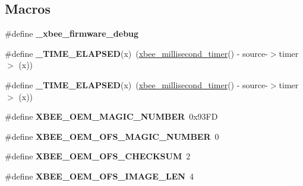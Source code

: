 \subsection*{Macros}
\begin{DoxyCompactItemize}
\item 
\mbox{\label{group__xbee__firmware_ga67178b0dd7b917c4416789c1b17931c0}} 
\#define {\bfseries \+\_\+xbee\+\_\+firmware\+\_\+debug}
\item 
\mbox{\label{group__xbee__firmware_ga89e5bb5d965f258c48d9cea25e67ebd9}} 
\#define {\bfseries \+\_\+\+T\+I\+M\+E\+\_\+\+E\+L\+A\+P\+S\+ED}(x)~(\hyperlink{group__hal_ga22b4e3df788254ca5f8530e9aee58515}{xbee\+\_\+millisecond\+\_\+timer}() -\/ source-\/$>$timer $>$ (x))
\item 
\mbox{\label{group__xbee__firmware_ga89e5bb5d965f258c48d9cea25e67ebd9}} 
\#define {\bfseries \+\_\+\+T\+I\+M\+E\+\_\+\+E\+L\+A\+P\+S\+ED}(x)~(\hyperlink{group__hal_ga22b4e3df788254ca5f8530e9aee58515}{xbee\+\_\+millisecond\+\_\+timer}() -\/ source-\/$>$timer $>$ (x))
\item 
\mbox{\label{group__xbee__firmware_gacc2d97a3340a997e4ac2df44e42d3220}} 
\#define {\bfseries X\+B\+E\+E\+\_\+\+O\+E\+M\+\_\+\+M\+A\+G\+I\+C\+\_\+\+N\+U\+M\+B\+ER}~0x93\+FD
\item 
\mbox{\label{group__xbee__firmware_gab7b27e58766348f7ee11552e19a3dc80}} 
\#define {\bfseries X\+B\+E\+E\+\_\+\+O\+E\+M\+\_\+\+O\+F\+S\+\_\+\+M\+A\+G\+I\+C\+\_\+\+N\+U\+M\+B\+ER}~0
\item 
\mbox{\label{group__xbee__firmware_ga61fbda32638ce4b34b34f9be4e323f69}} 
\#define {\bfseries X\+B\+E\+E\+\_\+\+O\+E\+M\+\_\+\+O\+F\+S\+\_\+\+C\+H\+E\+C\+K\+S\+UM}~2
\item 
\mbox{\label{group__xbee__firmware_ga30791d99a3f412a18712b68f42f913be}} 
\#define {\bfseries X\+B\+E\+E\+\_\+\+O\+E\+M\+\_\+\+O\+F\+S\+\_\+\+I\+M\+A\+G\+E\+\_\+\+L\+EN}~4
\item 
\mbox{\label{group__xbee__firmware_gab7cea8c88aa786bdc27e3e2a14f52278}} 

\end{DoxyCompactItemize}
